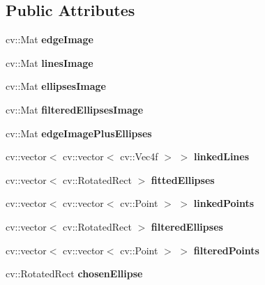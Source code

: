 \subsection*{Public Attributes}
\begin{DoxyCompactItemize}
\item 
\hypertarget{classMyEllipses_a5d00af69849dd1e6ef741605333a579f}{
cv::Mat {\bfseries edgeImage}}
\label{classMyEllipses_a5d00af69849dd1e6ef741605333a579f}

\item 
\hypertarget{classMyEllipses_a5e1fa370060bcb1aa5fa66488aba7da7}{
cv::Mat {\bfseries linesImage}}
\label{classMyEllipses_a5e1fa370060bcb1aa5fa66488aba7da7}

\item 
\hypertarget{classMyEllipses_a229b20b81bda1271ed7af085b482f84a}{
cv::Mat {\bfseries ellipsesImage}}
\label{classMyEllipses_a229b20b81bda1271ed7af085b482f84a}

\item 
\hypertarget{classMyEllipses_a82a483859edc940b8100c08e351bda43}{
cv::Mat {\bfseries filteredEllipsesImage}}
\label{classMyEllipses_a82a483859edc940b8100c08e351bda43}

\item 
\hypertarget{classMyEllipses_a9c6cb1c01422433b73e4e8f801ca1ca4}{
cv::Mat {\bfseries edgeImagePlusEllipses}}
\label{classMyEllipses_a9c6cb1c01422433b73e4e8f801ca1ca4}

\item 
\hypertarget{classMyEllipses_a4711376cc7c9a40d95e5e9e1cf4aae13}{
cv::vector$<$ cv::vector$<$ cv::Vec4f $>$ $>$ {\bfseries linkedLines}}
\label{classMyEllipses_a4711376cc7c9a40d95e5e9e1cf4aae13}

\item 
\hypertarget{classMyEllipses_a37c38bb0d7736ec0e1de6aa0bcf06c2e}{
cv::vector$<$ cv::RotatedRect $>$ {\bfseries fittedEllipses}}
\label{classMyEllipses_a37c38bb0d7736ec0e1de6aa0bcf06c2e}

\item 
\hypertarget{classMyEllipses_a9bb3cf9c6a77592fe5b08e5a7f454ade}{
cv::vector$<$ cv::vector$<$ cv::Point $>$ $>$ {\bfseries linkedPoints}}
\label{classMyEllipses_a9bb3cf9c6a77592fe5b08e5a7f454ade}

\item 
\hypertarget{classMyEllipses_a388a023ca6bd554712729db978d77179}{
cv::vector$<$ cv::RotatedRect $>$ {\bfseries filteredEllipses}}
\label{classMyEllipses_a388a023ca6bd554712729db978d77179}

\item 
\hypertarget{classMyEllipses_a2c6dd2ca86f919f0ff51a44edba915ca}{
cv::vector$<$ cv::vector$<$ cv::Point $>$ $>$ {\bfseries filteredPoints}}
\label{classMyEllipses_a2c6dd2ca86f919f0ff51a44edba915ca}

\item 
\hypertarget{classMyEllipses_a66d782a43dfb9f682ea8a3dcf018f9f5}{
cv::RotatedRect {\bfseries chosenEllipse}}
\label{classMyEllipses_a66d782a43dfb9f682ea8a3dcf018f9f5}

\end{DoxyCompactItemize}


